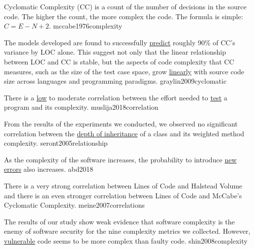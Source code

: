 \documentclass{article}
\begin{document}


  {Cyclomatic Complexity (CC) is a count of the number of decisions in the source code. The higher the count, the more complex the code. The formula is simple: \(C=E-N+2\).}
  {mccabe1976complexity}



  {The models developed are found to successfully \ul{predict} roughly 90\% of CC’s variance by LOC alone. This suggest not only that the linear relationship between LOC and CC is stable, but the aspects of code complexity that CC measures, such as the size of the test case space, grow \ul{linearly} with source code size across languages and programming paradigms.}
  {graylin2009cyclomatic}

  {There is a \ul{low} to moderate correlation between the effort needed to \ul{test} a program and its complexity.}
  {muslija2018correlation}

  {From the results of the experiments we conducted, we observed no significant correlation between the \ul{depth of inheritance} of a class and its weighted method complexity.}
  {seront2005relationship}

  {As the complexity of the software increases, the probability to introduce \ul{new errors} also increases.}
  {abd2018}

  {There is a very strong correlation between Lines of Code and Halstead Volume and there is an even stronger correlation between Lines of Code and McCabe's Cyclomatic Complexity.}
  {meine2007correlations}

  {The results of our study show weak evidence that software complexity is the enemy of software security for the nine complexity metrics we collected. However, \ul{vulnerable} code seems to be more complex than faulty code.}
  {shin2008complexity}
\end{document}
